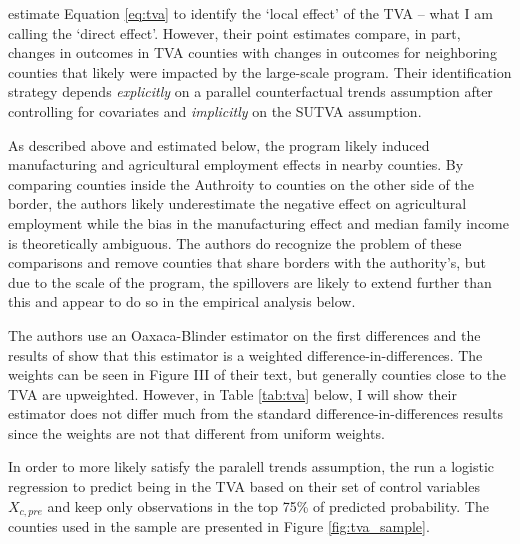 \documentclass[11pt]{article}
\begin{document}
\citet{Kline_Moretti_2014} estimate Equation \ref{eq:tva} to identify the `local effect' of the TVA -- what I am calling the `direct effect'. However, their point estimates compare, in part, changes in outcomes in TVA counties with changes in outcomes for neighboring counties that likely were impacted by the large-scale program. Their identification strategy depends \emph{explicitly} on a parallel counterfactual trends assumption after controlling for covariates and \emph{implicitly} on the SUTVA assumption. 

As described above and estimated below, the program likely induced manufacturing and agricultural employment effects in nearby counties. By comparing counties inside the Authroity to counties on the other side of the border, the authors likely underestimate the negative effect on agricultural employment while the bias in the manufacturing effect and median family income is theoretically ambiguous. The authors do recognize the problem of these comparisons and remove counties that share borders with the authority's, but due to the scale of the program, the spillovers are likely to extend further than this and appear to do so in the empirical analysis below.  

The authors use an Oaxaca-Blinder estimator on the first differences and the results of \citet{Kline_2011} show that this estimator is a weighted difference-in-differences. The weights can be seen in Figure III of their text, but generally counties close to the TVA are upweighted. However, in Table \ref{tab:tva} below, I will show their estimator does not differ much from the standard difference-in-differences results since the weights are not that different from uniform weights. 

In order to more likely satisfy the paralell trends assumption, the run a logistic regression to predict being in the TVA based on their set of control variables $X_{c, pre}$ and keep only observations in the top 75\% of predicted probability. The counties used in the sample are presented in Figure \ref{fig:tva_sample}. 
\end{document}
